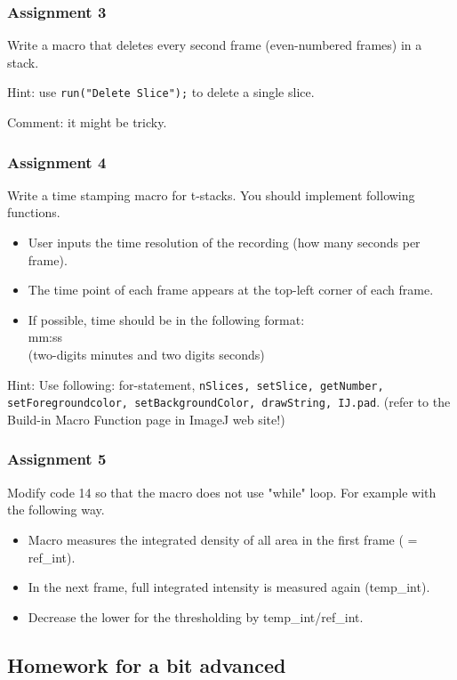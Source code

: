 \documentclass[11pt,a4paper,oneside]{report}
\newcommand{\ilcom}[1]{\texttt{\small#1}}
\begin{document}
\subsubsection{Assignment 3}  
Write a macro that deletes every second frame (even-numbered frames) in a stack. 

Hint: use \ilcom{run("Delete Slice");} to delete a single slice. 

Comment: it might be tricky.

\subsubsection{Assignment 4} 
Write a time stamping macro for t-stacks. You should implement following functions. 
\begin{itemize}
\item User inputs the time resolution of the recording (how many seconds per frame).
\item The time point of each frame appears at the top-left corner of each frame.  
\item If possible, time should be in the following format: \\
mm:ss \\
(two-digits minutes and two digits seconds)
\end{itemize}
Hint: Use following: for-statement, 
\ilcom{nSlices, setSlice, getNumber,\\ setForegroundcolor, setBackgroundColor,
drawString, IJ.pad}. (refer to the Build-in Macro Function page in ImageJ web
site!)

\subsubsection{Assignment 5} 
Modify code 14 so that the macro does not use "while" loop. For example with the following way. 
\begin{itemize}
\item Macro measures the integrated density of all area in the first frame ( = ref\_int).
\item In the next frame, full integrated intensity is measured again (temp\_int).
\item Decrease the lower for the thresholding by temp\_int/ref\_int.
 \end{itemize}

\subsection{Homework for a bit advanced}
\end{document}
